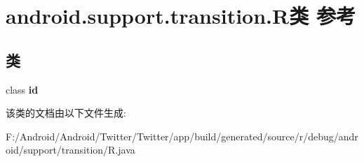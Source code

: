 \hypertarget{classandroid_1_1support_1_1transition_1_1_r}{}\section{android.\+support.\+transition.\+R类 参考}
\label{classandroid_1_1support_1_1transition_1_1_r}
\subsection*{类}
\begin{DoxyCompactItemize}
\item 
class {\bfseries id}
\end{DoxyCompactItemize}


该类的文档由以下文件生成\+:\begin{DoxyCompactItemize}
\item 
F\+:/\+Android/\+Android/\+Twitter/\+Twitter/app/build/generated/source/r/debug/android/support/transition/R.\+java\end{DoxyCompactItemize}
